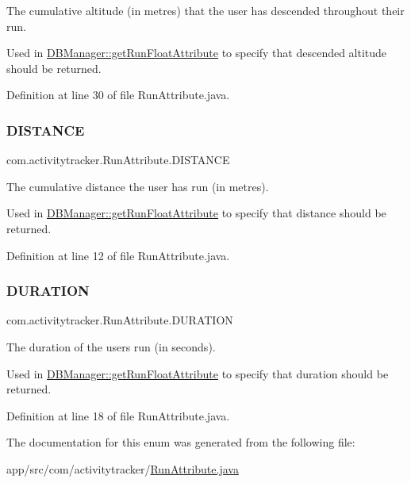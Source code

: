 The cumulative altitude (in metres) that the user has descended throughout their run.

Used in \mbox{\hyperlink{classcom_1_1activitytracker_1_1_d_b_manager_a666452f1e5862f90c06b0beb9a9fcfdd}{D\+B\+Manager\+::get\+Run\+Float\+Attribute}} to specify that descended altitude should be returned. 

Definition at line 30 of file Run\+Attribute.\+java.

\mbox{\label{enumcom_1_1activitytracker_1_1_run_attribute_a90ee541e68e458a0bb3f5ea45fd46ec0}} 
\subsubsection{\texorpdfstring{D\+I\+S\+T\+A\+N\+CE}{DISTANCE}}
{\footnotesize\ttfamily com.\+activitytracker.\+Run\+Attribute.\+D\+I\+S\+T\+A\+N\+CE}

The cumulative distance the user has run (in metres).

Used in \mbox{\hyperlink{classcom_1_1activitytracker_1_1_d_b_manager_a666452f1e5862f90c06b0beb9a9fcfdd}{D\+B\+Manager\+::get\+Run\+Float\+Attribute}} to specify that distance should be returned. 

Definition at line 12 of file Run\+Attribute.\+java.

\mbox{\label{enumcom_1_1activitytracker_1_1_run_attribute_a7adf133b2a62f1f99ffc2adfb7097ec9}} 
\subsubsection{\texorpdfstring{D\+U\+R\+A\+T\+I\+ON}{DURATION}}
{\footnotesize\ttfamily com.\+activitytracker.\+Run\+Attribute.\+D\+U\+R\+A\+T\+I\+ON}

The duration of the user\textquotesingle{}s run (in seconds).

Used in \mbox{\hyperlink{classcom_1_1activitytracker_1_1_d_b_manager_a666452f1e5862f90c06b0beb9a9fcfdd}{D\+B\+Manager\+::get\+Run\+Float\+Attribute}} to specify that duration should be returned. 

Definition at line 18 of file Run\+Attribute.\+java.



The documentation for this enum was generated from the following file\+:\begin{DoxyCompactItemize}
\item 
app/src/com/activitytracker/\mbox{\hyperlink{_run_attribute_8java}{Run\+Attribute.\+java}}\end{DoxyCompactItemize}
